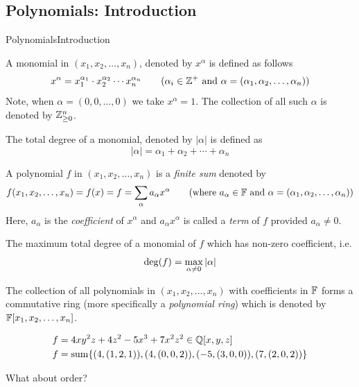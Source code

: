 \documentclass[aspectratio=169, handout, 10pt, hyperref=colorlinks]{beamer}
\begin{document}
\subsection{Polynomials: Introduction}
\begin{frame}[allowframebreaks]{Polynomials}{Introduction}
  \begin{defn}[Monomial]
    A monomial in $(x_1, x_2, \ldots, x_n)$, denoted by $x^\alpha$ is defined as follows
    \begin{equation}
        x^\alpha= x_1^{\alpha_1}\cdot x_2^{\alpha_2}\cdots x_n^{\alpha_n} \qquad(\alpha_i \in \mathbb{Z}^+ \text{ and } \alpha = (\alpha_1, \alpha_2, \ldots, \alpha_n))
    \end{equation}
Note, when $\alpha = (0,0,\ldots,0)$ we take $x^\alpha=1$. The collection of all such $\alpha$ is denoted by $\mathbb{Z}^n_{\geq0}$.
\end{defn}
\begin{defn}
    The total degree of a monomial, denoted by $|\alpha|$ is defined as
    \begin{equation}
        |\alpha| = \alpha_1 + \alpha_2 + \cdots + \alpha_n
    \end{equation}
\end{defn}
\begin{defn}[Polynomial]
    A polynomial $f$ in $(x_1, x_2, \ldots, x_n)$ is a \emph{finite sum} denoted by
    \begin{equation}
        f(x_1, x_2, \ldots, x_n) = f(x) = f = \sum_\alpha a_\alpha x^\alpha \qquad(\text{where } a_\alpha \in \mathbb{F} \text{ and } \alpha = (\alpha_1, \alpha_2, \ldots, \alpha_n))
    \end{equation}
Here, $a_\alpha$ is the \emph{coefficient} of $x^\alpha$ and $a_\alpha x^\alpha$ is called a \emph{term} of $f$ provided $a_\alpha \neq 0$.
\end{defn}
\begin{defn}
    The maximum total degree of a monomial of $f$ which has non-zero coefficient, i.e.
    \begin{equation}
        \operatorname{deg}(f) = \max_{\alpha\neq0} |\alpha|
    \end{equation}
\end{defn}
The collection of all polynomials in $(x_1, x_2, \ldots, x_n)$ with coefficients in $\mathbb{F}$ forms a commutative ring (more specifically a \emph{polynomial ring}) which is denoted by $\mathbb{F}[x_1, x_2, \ldots, x_n]$.

    \begin{example}
        \begin{equation}{\label{eq:polynomialexample}}
        \begin{aligned}
            f&=4xy^2z+4z^2-5x^3+7x^2z^2\in\mathbb{Q}[x,y,z]\\
            f&=\operatorname{sum}\{(4,(1,2,1)), (4,(0,0,2)), (-5,(3,0,0)), (7,(2,0,2))\}
        \end{aligned}
    \end{equation}
    \end{example}
    What about order?
\end{frame}
\end{document}
